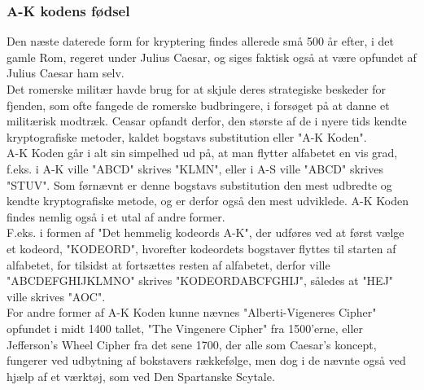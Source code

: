 \subsubsection{A-K kodens fødsel}
Den næste daterede form for kryptering findes allerede små 500 år efter, i det gamle Rom, regeret under Julius Caesar, og siges faktisk også at være opfundet af Julius Caesar ham selv.\cite{PastCryptography}\\ 
Det romerske militær havde brug for at skjule deres strategiske beskeder for fjenden, som ofte fangede de romerske budbringere, i forsøget på at danne et militærisk modtræk. Ceasar opfandt derfor, den største af de i nyere tids kendte kryptografiske metoder, kaldet bogstavs substitution eller "A-K Koden".\\
A-K Koden går i alt sin simpelhed ud på, at man flytter alfabetet en vis grad, f.eks. i A-K ville "ABCD" skrives "KLMN", eller i A-S ville "ABCD" skrives "STUV".\cite{TheSecretLanguage}
Som førnævnt er denne bogstavs substitution den mest udbredte og kendte kryptografiske metode, og er derfor også den mest udviklede. A-K Koden findes nemlig også i et utal af andre former.\\ 
F.eks. i formen af "Det hemmelig kodeords A-K", der udføres ved at først vælge et kodeord, "KODEORD", hvorefter kodeordets bogstaver flyttes til starten af alfabetet, for tilsidst at fortsættes resten af alfabetet, derfor ville "ABCDEFGHIJKLMNO" skrives "KODEORDABCFGHIJ", således at "HEJ" ville skrives "AOC". \cite{TheSecretLanguage}\\
For andre former af A-K Koden kunne nævnes "Alberti-Vigeneres Cipher" opfundet i midt 1400 tallet, "The Vingenere Cipher" fra 1500'erne, eller Jefferson's Wheel Cipher fra det sene 1700\cite{PastCryptography}, der alle som Caesar's koncept, fungerer ved udbytning af bokstavers rækkefølge, men dog i de nævnte også ved hjælp af et værktøj, som ved Den Spartanske Scytale.\\
